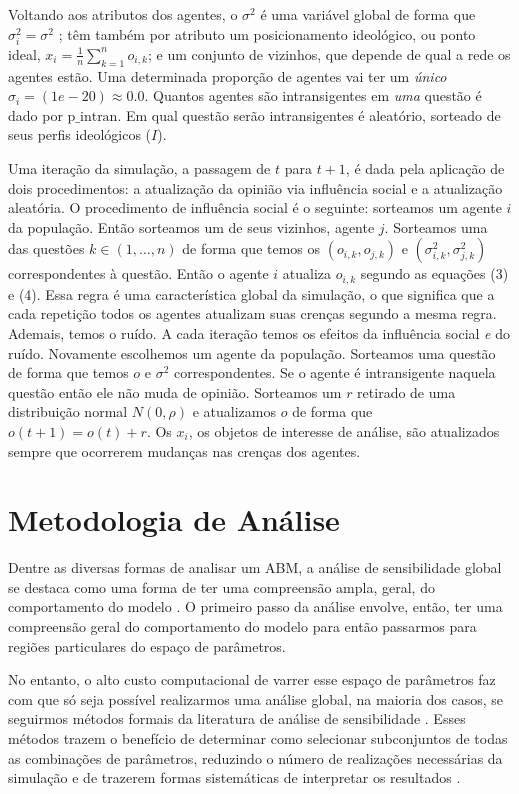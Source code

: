 Voltando aos atributos dos agentes, o \(\sigma^2\) é uma variável global de
forma que \(\sigma_i^2 = \sigma^2\) ; têm também por atributo um posicionamento
ideológico, ou ponto ideal, \(x_i = \frac{1}{n} \sum_{k = 1}^n o_{i,k} \); e um
conjunto de vizinhos, que depende de qual a rede os agentes estão. Uma
determinada proporção de agentes vai ter um \textit{único} \(\sigma_i = (1e-20 )
\approx 0.0 \). Quantos agentes são intransigentes em \textit{uma} questão é
dado por \(\text{p\_intran}\). Em qual questão serão intransigentes é aleatório,
sorteado de seus perfis ideológicos (\(I\)).

Uma iteração da simulação, a passagem de \(t\) para \(t+1\), é dada pela
aplicação de dois procedimentos: a atualização da opinião via influência social
e a atualização aleatória. O procedimento de influência social é o seguinte:
sorteamos um agente \(i\) da população. Então sorteamos um de seus vizinhos,
agente \(j\). Sorteamos uma das questões \(k \in (1,\ldots,n)\) de forma que
temos os \((o_{i,k},o_{j,k})\) e \((\sigma_{i,k}^2,\sigma_{j,k}^2)\)
correspondentes à questão. Então o agente \(i\) atualiza \(o_{i,k}\) segundo as
equações (3) e (4). Essa regra é uma característica global da simulação, o que
significa que a cada repetição todos os agentes atualizam suas crenças segundo a
mesma regra. Ademais, temos o ruído. A cada iteração temos os efeitos da
influência social \textit{e} do ruído. Novamente escolhemos um agente da
população. Sorteamos uma questão de forma que temos \(o\) e \(\sigma^2\)
correspondentes. Se o agente é intransigente naquela questão então ele não muda
de opinião. Sorteamos um \(r\) retirado de uma distribuição normal \(N(0,\rho)\)
e atualizamos \(o\) de forma que \(o(t+1) = o(t) + r\). Os \(x_i\), os objetos
de interesse de análise, são atualizados sempre que ocorrerem mudanças nas
crenças dos agentes.

\section{Metodologia de Análise}

Dentre as diversas formas de analisar um ABM, a análise de sensibilidade global
se destaca como uma forma de ter uma compreensão ampla, geral, do comportamento
do modelo \cite{north2007managing}. O primeiro passo da análise envolve, então,
ter uma compreensão geral do comportamento do modelo para então passarmos para
regiões particulares do espaço de parâmetros.

No entanto, o alto custo computacional de varrer esse espaço de parâmetros faz com
que só seja possível realizarmos uma análise global, na maioria dos casos, se
seguirmos métodos formais da literatura de análise de sensibilidade
\cite{railsback2012agent}. Esses métodos trazem o benefício de determinar como
selecionar subconjuntos de todas as combinações de parâmetros, reduzindo o
número de realizações necessárias da simulação e de trazerem formas sistemáticas
de interpretar os resultados \cite{railsback2012agent}.


